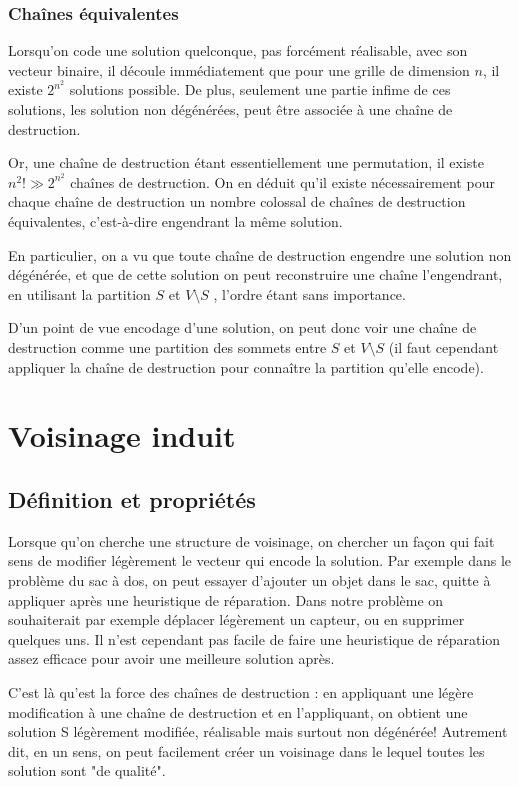 \documentclass[12pt,a4paper]{article}
\begin{document}
\subsubsection{Chaînes équivalentes}
Lorsqu'on code une solution quelconque, pas forcément réalisable, avec son vecteur binaire, il découle immédiatement que pour une grille de dimension $n$, il existe $2^{n^2}$ solutions possible. De plus, seulement une partie infime de ces solutions, les solution non dégénérées, peut être associée à une chaîne de destruction.

Or, une chaîne de destruction étant essentiellement une permutation, il existe $n^2!\gg 2^{n^2}$ chaînes de destruction. On en déduit qu'il existe nécessairement pour chaque chaîne de destruction un nombre colossal de chaînes de destruction équivalentes, c'est-à-dire engendrant la même solution.

En particulier, on a vu que toute chaîne de destruction engendre une solution non dégénérée, et que de cette solution on peut reconstruire une chaîne l'engendrant, en utilisant la partition $S$ et $V\setminus S$ , l'ordre étant sans importance.


D'un point de vue encodage d'une solution, on peut donc voir une chaîne de destruction comme une partition des sommets entre $S$ et $V\setminus S$ (il faut cependant appliquer la chaîne de destruction pour connaître la partition qu'elle encode).

\section{Voisinage induit}
\subsection{Définition et propriétés}
Lorsque qu'on cherche une structure de voisinage, on chercher un façon qui fait sens de modifier légèrement le vecteur qui encode la solution. Par exemple dans le problème du sac à dos, on peut essayer d'ajouter un objet dans le sac, quitte à appliquer après une heuristique de réparation. Dans notre problème on souhaiterait par exemple déplacer légèrement un capteur, ou en supprimer quelques uns. Il n'est cependant pas facile de faire une heuristique de réparation assez efficace pour avoir une meilleure solution après.

C'est là qu'est la force des chaînes de destruction : en appliquant une légère modification à une chaîne de destruction et en l'appliquant, on obtient une solution S légèrement modifiée, réalisable mais surtout non dégénérée! Autrement dit, en un sens, on peut facilement créer un voisinage dans le lequel toutes les solution sont "de qualité".
\end{document}
